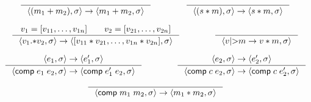 \documentclass{article}
\begin{document}
\[
\inference[]{}{\env{(m_1+m_2)}->\env{m_1+m_2}}
\qquad\qquad
\inference[]{}{\env{(s*m)}->\env{s*m}}
\]

\[
\inference[]{v_1=[v_{11},\dots,v_{1n}]\qquad v_2=[v_{21},\dots,v_{2n}]}
{\env{v_1\mathsf{.*}v_2}->\env{[v_{11}*v_{21},\dots,v_{1n}*v_{2n}]}}
\qquad\qquad
\inference[]{}
{\env{v\textnormal{|>}m->v*m}}
\]

\[
\inference[]{\env{e_1}->\env{e_1'}}{\env{\mathsf{comp}\;e_1\;e_2}->\env{\mathsf{comp}\;e_1'\;e_2}}
\qquad\qquad
\inference[]{\env{e_2}->\env{e_2'}}{\env{\mathsf{comp}\;c\;e_2}->\env{\mathsf{comp}\;c\;e_2'}}
\]

\[
\inference[]{}{\env{\mathsf{comp}\;m_1\;m_2}->\env{m_1*m_2}}
\]
\end{document}
